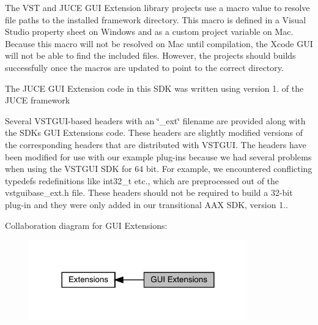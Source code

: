 \begin{DoxyItemize}
\item The V\+ST and J\+U\+CE G\+UI Extension library projects use a macro value to resolve file paths to the installed framework directory. This macro is defined in a Visual Studio property sheet on Windows and as a custom project variable on Mac. Because this macro will not be resolved on Mac until compilation, the Xcode G\+UI will not be able to find the included files. However, the projects should builds successfully once the macros are updated to point to the correct directory.
\item The J\+U\+CE G\+UI Extension code in this S\+DK was written using version 1. of the J\+U\+CE framework
\item Several V\+S\+T\+G\+U\+I-\/based headers with an \char`\"{}\+\_\+ext\char`\"{} filename are provided along with the S\+DK\textquotesingle{}s G\+UI Extensions code. These headers are slightly modified versions of the corresponding headers that are distributed with V\+S\+T\+G\+UI. The headers have been modified for use with our example plug-\/ins because we had several problems when using the V\+S\+T\+G\+UI S\+DK for 64 bit. For example, we encountered conflicting typedefs redefinitions like int32\+\_\+t etc., which are preprocessed out of the vstguibase\+\_\+ext.\+h file. These headers should not be required to build a 32-\/bit plug-\/in and they were only added in our transitional A\+AX S\+DK, version 1.. 
\end{DoxyItemize}Collaboration diagram for G\+UI Extensions\+:
\nopagebreak
\begin{figure}[H]
\begin{center}
\leavevmode
\includegraphics[width=266pt]{a00838}
\end{center}
\end{figure}
